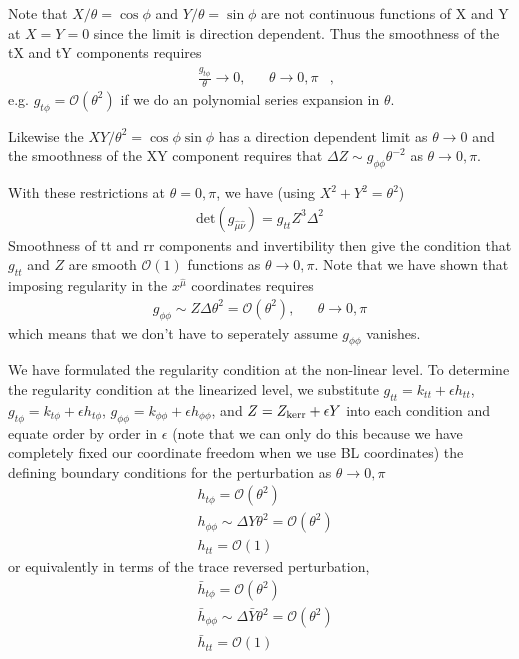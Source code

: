 \documentclass[aps,prd,amsmath,showpacs,amssymb,superscriptaddress,nofootinbib,longbibliography,eqsecnum,preprintnumbers]{revtex4-1}
\begin{document}
Note that $X/\theta=\cos \phi$ and $Y/\theta =\sin \phi$ are not continuous functions of X and Y at $X=Y=0$ since the limit is direction dependent. Thus the smoothness of the tX and tY components requires
\begin{align}
&\frac{g_{t\phi}}{\theta} \to 0,& &\theta \to 0, \pi&,
\end{align}
e.g. $g_{t\phi} =\mathcal{O}(\theta^2)$ if we do an polynomial series expansion in $\theta$.

Likewise the $XY/\theta^2=\cos\phi\sin\phi$ has a direction dependent limit as $\theta \to 0$ and the smoothness of the XY component requires that $\Delta Z \sim g_{\phi\phi}\theta^{-2}$ as $\theta \to 0, \pi$.

With these restrictions at $\theta = 0, \pi$, we have (using $X^2+Y^2=\theta^2$)
\begin{align}
\text{det} (g_{\hat \mu \hat \nu}) =g_{tt} Z^3\Delta^2
\end{align}
Smoothness of tt and rr components and invertibility then give the condition that $g_{tt}$ and $Z$ are smooth $\mathcal{O}(1)$ functions as $\theta \to 0,\pi$.
Note that we have shown that imposing regularity in the $x^{\hat \mu}$ coordinates requires
\begin{align}
&g_{\phi\phi} \sim Z\Delta \theta^2 =\mathcal{O}(\theta^2),& &\theta \to 0, \pi&
\end{align}
which means that we don't have to seperately assume $g_{\phi \phi}$ vanishes.

We have formulated the regularity condition at the non-linear level. To determine the regularity condition at the linearized level, we substitute 
$g_{tt}=k_{tt}+\epsilon h_{tt}$,  $g_{t\phi}=k_{t\phi}+\epsilon h_{t\phi}$,  $g_{\phi\phi}=k_{\phi\phi}+\epsilon h_{\phi\phi}$, and 
$Z= Z_{\rm kerr}+\epsilon Y$ into each condition and equate order by order in $\epsilon$ (note that we can only do this because we have completely fixed our coordinate freedom when we use BL coordinates) the defining boundary conditions for the perturbation as $\theta \to 0, \pi$
\begin{align}
&h_{t\phi} =\mathcal{O}(\theta^2) \nonumber \\
&h_{\phi\phi} \sim \Delta Y \theta^2 =\mathcal{O}(\theta^2) \nonumber \\
&h_{tt} =\mathcal{O}(1) \label{eq: axisBC}
\end{align}
or equivalently in terms of the trace reversed perturbation,
\begin{align}
&\bar h_{t\phi} =\mathcal{O}(\theta^2) \nonumber \\
&\bar h_{\phi\phi} \sim \Delta \bar Y \theta^2 =\mathcal{O}(\theta^2) \nonumber \\
&\bar h_{tt} =\mathcal{O}(1) \label{eq: axisBC}
\end{align}
\end{document}
